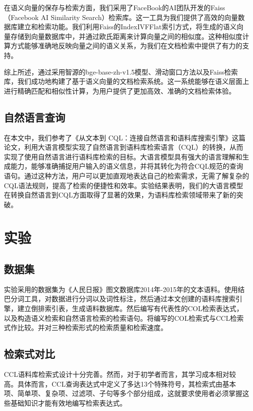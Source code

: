 \documentclass[11pt]{article}
\begin{document}
\begin{CJK*}{UTF8}{gbsn}
在语义向量的保存与检索方面，我们采用了FaceBook的AI团队开发的Faiss（Facebook AI Similarity Search）检索库。这一工具为我们提供了高效的向量数据库建立和检索功能。我们利用Faiss的IndexIVFFlat索引方式，将生成的语义向量存储到向量数据库中，并通过欧氏距离来计算向量之间的相似度。这种相似度计算方式能够准确地反映向量之间的语义关系，为我们在文档检索中提供了有力的支持。

综上所述，通过采用智源的bge-base-zh-v1.5模型、滑动窗口方法以及Faiss检索库，我们成功地构建了基于语义向量的文档检索系统。这一系统能够在语义层面上进行精确匹配和相似性计算，为用户提供了更加高效、准确的文档检索体验。

\subsection{自然语言查询}

在本文中，我们参考了《从文本到 CQL：连接自然语言和语料库搜索引擎》这篇论文，利用大语言模型实现了自然语言到语料库检索语言（CQL）的转换，从而实现了使用自然语言进行语料库检索的目标。大语言模型具有强大的语言理解和生成能力，能够准确捕捉用户输入的语义信息，并将其转化为符合CQL规范的查询语句。通过这种方法，用户可以更加直观地表达自己的检索需求，无需了解复杂的CQL语法规则，提高了检索的便捷性和效率。实验结果表明，我们的大语言模型在转换自然语言到CQL方面取得了显著的效果，为语料库检索领域带来了新的突破。

\section{实验}

\subsection{数据集}

实验采用的数据集为《人民日报》图文数据库2014年-2015年的文本语料。使用结巴分词工具，对数据进行分词以及词性标注，然后通过本文创建的语料库搜索引擎，建立倒排索引表，生成语料数据库。然后编写有代表性的COL检索表达式，以及构造语义检索和自然语言检索的检索语句。将编写的COL检索式与CCL检索式作比较。并对三种检索形式的检索质量和检索速度。

\subsection{检索式对比}

CCL语料库检索式设计十分完善。然而，对于初学者而言，其学习成本相对较高。具体而言，CCL查询表达式中定义了多达13个特殊符号，其检索式由基本项、简单项、复杂项、过滤项、子句等多个部分组成，这就要求使用者必须掌握这些基础知识才能有效地编写检索表达式。


\end{CJK*}
\end{document}
